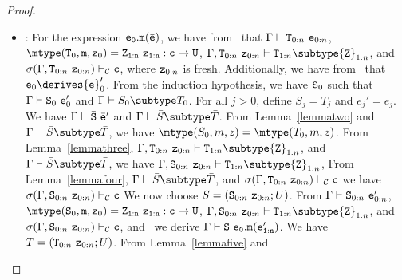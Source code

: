 \begin{proof}
\begin{itemize}
\begin{itemize}
   \item
   \RCInvkRecv: For the expression ${\tt e_0.m(\bar{e})}$,
            we have from \TInvk\ that
            $\Gamma \vdash {\tt T}_{0:n} \ {\tt e}_{0:n}$,
            $\mtype({\tt T}_0,{\tt m},{\tt z}_0) = 
               \tt {\tt Z}_{1:n}\ {\tt z}_{1:n}:c \rightarrow {\tt U}$,
            $\Gamma, {\tt T}_{0:n}\ {\tt z}_{0:n} \vdash 
                  {\tt T}_{1:n} \subtype {\tt Z}_{1:n}$, and
            $\sigma(\Gamma, {\tt T}_{0:n}\ {\tt z}_{0:n}) \vdash_{\cal C}                          {\tt c}$, 
            where ${\tt z}_{0:n}$ is fresh.
            Additionally, we have from \RCInvkRecv\ that
            ${\tt e}_0 \derives {{\tt e}}_0'$.
            From the induction hypothesis, we have ${\tt S}_0$ such that
            $\Gamma \vdash {\tt S}_0\ {{\tt e}}_0'$ and 
            $\Gamma \vdash S_0 \subtype T_0$.
            For all $j>0$, define $S_j = T_j$ and $e_j' = e_j$.
            We have 
            $\Gamma \vdash \bar{\tt S}\ \bar{\tt e}'$ and
            $\Gamma \vdash \bar{S} \subtype \bar{T}$.
            From Lemma~\ref{lemmatwo}
            and $\Gamma \vdash \bar{S} \subtype \bar{T}$, we have
            $\mtype(S_0,m,z) = \mtype(T_0,m,z)$.
            From Lemma~\ref{lemmathree},
            $\Gamma, {\tt T}_{0:n}\ {\tt z}_{0:n} \vdash
                  {\tt T}_{1:n} \subtype {\tt Z}_{1:n}$,
            and $\Gamma \vdash \bar{S} \subtype \bar{T}$, we have
            $\Gamma, {\tt S}_{0:n}\ {\tt z}_{0:n} \vdash
                  {\tt T}_{1:n} \subtype {\tt Z}_{1:n}$,
            From Lemma~\ref{lemmafour}, 
            $\Gamma \vdash \bar{S} \subtype \bar{T}$, and
            $\sigma(\Gamma, {\tt T}_{0:n}\ {\tt z}_{0:n}) \vdash_{\cal C}
                              {\tt c}$
            we have
            $\sigma(\Gamma, {\tt S}_{0:n}\ {\tt z}_{0:n}) \vdash_{\cal C}
                              {\tt c}$
            We now choose 
               $S=({\tt S}_{0:n}\ {\tt z}_{0:n}; U)$.
            From 
            $\Gamma \vdash {\tt S}_{0:n} \ {\tt e}_{0:n}'$,
            $\mtype({\tt S}_0,{\tt m},{\tt z}_0) =
               \tt {\tt Z}_{1:n}\ {\tt z}_{1:n}:c \rightarrow {\tt U}$,
            $\Gamma, {\tt S}_{0:n}\ {\tt z}_{0:n} \vdash
                  {\tt T}_{1:n} \subtype {\tt Z}_{1:n}$, and
            $\sigma(\Gamma, {\tt S}_{0:n}\ {\tt z}_{0:n}) \vdash_{\cal C}
                  {\tt c}$,
            and \TInvk\ we derive
            $\Gamma \vdash {\tt S}\ {\tt e_0.m(e_{1:n}')}$.
            We have 
               $T=({\tt T}_{0:n}\ {\tt z}_{0:n}; U)$.
            From Lemma~\ref{lemmafive} and

\end{itemize}
\end{itemize}
\end{proof}
